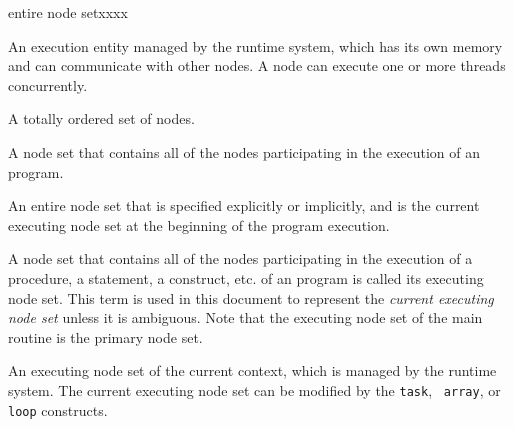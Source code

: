 \begin{namelist}{entire node setxxxx}

%



 An execution entity managed by the {\XMP} runtime system, which has its
 own memory and can communicate with other nodes. A node can execute one
 or more threads concurrently.

%


 A totally ordered set of nodes.


 A node set that contains all of the nodes participating in the
 execution of an {\XMP} program.


 An entire node set that is specified explicitly or implicitly, and is
 the current executing node set at the beginning of the program
 execution.


 A node set that contains all of the nodes participating in the
 execution of a procedure, a statement, a construct, etc. of an
 {\XMP} program is called its executing node set.
%
 This term is used in this document to represent the {\it current
 executing node set} unless it is ambiguous.
%
 Note that the executing node set of the main routine is the
 primary node set.


 An executing node set of the current context, which is managed by the
 {\XMP} runtime system.
%
 The current executing node set can be modified by the {\tt task}, {\tt
 array}, or {\tt loop} constructs. 



\end{namelist}
